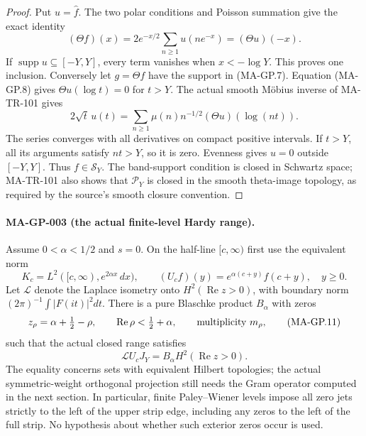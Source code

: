 \begin{proof}
Put $u=\widehat f$.  The two polar conditions and Poisson
summation give the exact identity
\[
 (\Theta f)(x)=2e^{-x/2}\sum_{n\ge1}u(ne^{-x})
                              =(\Theta u)(-x).
 \tag{MA-GP.8}
\]
If $\operatorname{supp}u\subseteq[-Y,Y]$, every term vanishes
when $x< -\log Y$.  This proves one inclusion.
Conversely let $g=\Theta f$ have the support in (MA-GP.7).
Equation (MA-GP.8) gives $\Theta u(\log t)=0$ for $t>Y$.
The actual smooth M\"obius inverse of MA-TR-101 gives
\[
 2\sqrt t\,u(t)
    =\sum_{n\ge1}\mu(n)n^{-1/2}(\Theta u)(\log(nt)).
 \tag{MA-GP.9}
\]
The series converges with all derivatives on compact
positive intervals.  If $t>Y$, all its arguments satisfy
$nt>Y$, so it is zero.  Evenness gives $u=0$ outside
$[-Y,Y]$.  Thus $f\in\mathscr S_Y$.
The band-support condition is closed in Schwartz space;
MA-TR-101 also shows that $\mathscr P_Y$ is closed in
the smooth theta-image topology, as required by the
source's smooth closure convention.
\end{proof}

\paragraph{MA-GP-003 (the actual finite-level Hardy range).}
Assume $0<\alpha<1/2$ and $s=0$.  On the half-line $[c,\infty)$
first use the equivalent norm
\[
 K_c=L^2([c,\infty),e^{2\alpha x}\,dx),\qquad
 (U_cf)(y)=e^{\alpha(c+y)}f(c+y),\quad y\ge0.
 \tag{MA-GP.10}
\]
Let $\mathcal L$ denote the Laplace isometry onto
$H^2(\operatorname{Re}z>0)$, with boundary norm
$(2\pi)^{-1}\int|F(it)|^2dt$.
There is a pure Blaschke product $B_\alpha$ with zeros
\[
 z_\rho=\alpha+\tfrac12-\rho,
 \qquad \operatorname{Re}\rho<\tfrac12+\alpha,
 \qquad\hbox{multiplicity }m_\rho,
 \tag{MA-GP.11}
\]
such that the actual closed range satisfies
\[
            \mathcal L U_cJ_Y=B_\alpha H^2(\operatorname{Re}z>0).
 \tag{MA-GP.12}
\]
The equality concerns sets with equivalent Hilbert topologies;
the actual symmetric-weight orthogonal projection still needs
the Gram operator computed in the next section.  In particular,
finite Paley--Wiener levels impose all zero jets strictly to
the left of the upper strip edge, including any zeros to the
left of the full strip.  No hypothesis about whether such
exterior zeros occur is used.

